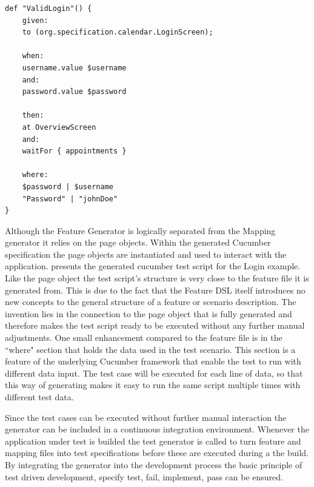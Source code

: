 \documentclass{sig-alternate-05-2015}
\begin{document}
{\begin{lstlisting}[captionpos=b, caption=Generated Feature File, label={lst:featureGenerated}, language=dsl]
	def "ValidLogin"() {
	given:
	to (org.specification.calendar.LoginScreen);
	
	when:
	username.value $username
	and:
	password.value $password
	
	then:
	at OverviewScreen
	and:
	waitFor { appointments }
	
	where:
	$password | $username
	"Password" | "johnDoe"
}
\end{lstlisting}
Although the Feature Generator is logically separated from the Mapping generator it relies on the page objects.
Within the generated Cucumber specification the page objects are instantiated and used to interact with the application.
 presents the generated cucumber test script for the Login example. 
Like the page object the test script's structure is very close to the feature file it is generated from.
This is due to the fact that the Feature DSL itself introduces no new concepts to the general structure of a feature or scenario description.
The invention lies in the connection to the page object that is fully generated and therefore makes the test script ready to be executed without any further manual adjustments.
One small enhancement compared to the feature file is in the ``where" section that holds the data used in the test scenario.
This section is a feature of the underlying Cucumber framework that enable the test to run with different data input. 
The test case will be executed for each line of data, so that this way of generating makes it easy to run the same script multiple times with different test data.

Since the test cases can be executed without further manual interaction the generator can be included in a continuous integration environment.
Whenever the application under test is builded the test generator is called to turn feature and mapping files into test specifications before these are executed during a the build.
By integrating the generator into the development process the basic principle of test driven development, specify test, fail, implement, pass can be ensured.


}
\end{document}
